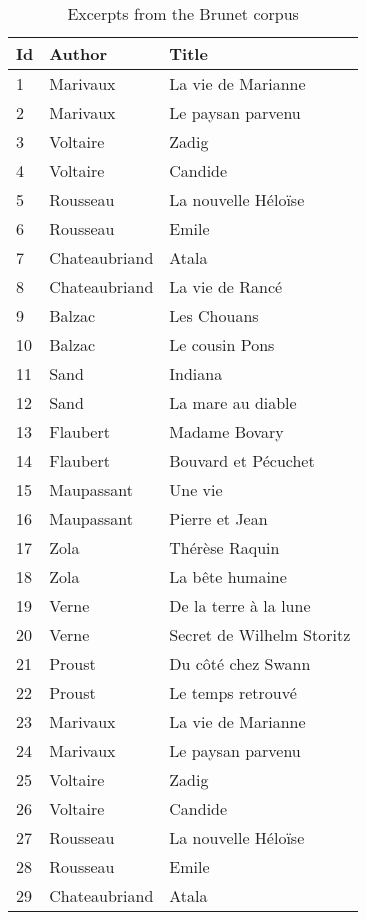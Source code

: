 \begin{table}[H]
  \small
  \centering
  \caption{Excerpts from the Brunet corpus}
  \label{tbl:brunet_corpus}

  \begin{tabular}{l l l}
    \toprule
    \textbf{Id} &
    \textbf{Author} &
    \textbf{Title} \\
    \midrule
    1 & Marivaux & La vie de Marianne \\
    2 & Marivaux & Le paysan parvenu \\
    3 & Voltaire & Zadig \\
    4 & Voltaire & Candide \\
    5 & Rousseau & La nouvelle Héloïse \\
    6 & Rousseau & Emile \\
    7 & Chateaubriand & Atala \\
    8 & Chateaubriand & La vie de Rancé \\
    9 & Balzac & Les Chouans \\
    10 & Balzac & Le cousin Pons \\
    11 & Sand & Indiana \\
    12 & Sand & La mare au diable \\
    13 & Flaubert & Madame Bovary \\
    14 & Flaubert & Bouvard et Pécuchet \\
    15 & Maupassant & Une vie \\
    16 & Maupassant & Pierre et Jean \\
    17 & Zola & Thérèse Raquin \\
    18 & Zola & La bête humaine \\
    19 & Verne & De la terre à la lune \\
    20 & Verne & Secret de Wilhelm Storitz \\
    21 & Proust & Du côté chez Swann \\
    22 & Proust & Le temps retrouvé \\
    23 & Marivaux & La vie de Marianne \\
    24 & Marivaux & Le paysan parvenu \\
    25 & Voltaire & Zadig \\
    26 & Voltaire & Candide \\
    27 & Rousseau & La nouvelle Héloïse \\
    28 & Rousseau & Emile \\
    29 & Chateaubriand & Atala \\

\end{tabular}
\end{table}
